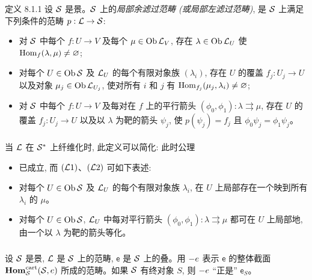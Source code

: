 \begin{enonce*}{定义 8.1.1}
设 ${\mathcal S}$ 是景。${\mathcal S}$ 上的\emph{局部余滤过范畴 (或局部左滤过范畴)}, 是 ${\mathcal S}$ 上满足下列条件的范畴 $p:\Ll\to\Ss$:
\begin{itemize}
\item[($\Ll0$)] 对 ${\mathcal S}$ 中每个 $f:U\to V$ 及每个 $\mu\in\operatorname{Ob}{\mathcal L}_V$, 存在 $\lambda\in\operatorname{Ob}{\mathcal L}_U$ 使 $\operatorname{Hom}_f(\lambda,\mu)\neq\varnothing$;

\item[($\Ll1$)] 对每个 $U\in\operatorname{Ob}{\mathcal S}$ 及 ${\mathcal L}_U$ 的每个有限对象族 $(\lambda_i)$, 存在 $U$ 的覆盖 $f_j:U_j\to U$ 以及对象 $\mu_j\in\operatorname{Ob}{\mathcal L}_{U_j}$, 使对所有 $i$ 和 $j$ 有 $\operatorname{Hom}_{f_j}(\mu_j,\lambda_i)\neq\varnothing$;

\item[($\Ll2$)] 对 ${\mathcal S}$ 中每个 $f:U\to V$ 及每对在 $f$ 上的平行箭头 $(\phi_0,\phi_1):\lambda\rightrightarrows\mu$, 存在 $U$ 的覆盖 $f_j:U_j\to U$ 以及以 $\lambda$ 为靶的箭头 $\psi_j$, 使 $p(\psi_j)=f_j$ 且 $\phi_0\psi_j=\phi_1\psi_j$。
\end{itemize}
\end{enonce*}

\setcounter{subsubsection}{1}
\paragraph{}
当 ${\mathcal L}$ 在 ${\mathcal S}^{\ast}$ 上纤维化时, 此定义可以简化: 此时公理
\begin{itemize}
\item[$(\Ll_\ast0)$] 已成立, 而 $({\mathcal L}1)$、$({\mathcal L}2)$ 可如下表述:

\item[$(\Ll'1)$] 对每个 $U\in\operatorname{Ob}{\mathcal S}$ 及 ${\mathcal L}_U$ 的每个有限对象族 $\lambda_i$, 在 $U$ 上局部存在一个映到所有 $\lambda_i$ 的 $\mu$。

\item[$(\Ll'2)$] 对每个 $U\in\operatorname{Ob}{\mathcal S}$, ${\mathcal L}_U$ 中每对平行箭头 $(\phi_0,\phi_1):\lambda\rightrightarrows\mu$ 都可在 $U$ 上局部地, 由一个以 $\lambda$ 为靶的箭头等化。
\end{itemize}

\subsubsection{}
设 ${\mathcal S}$ 是景, ${\mathcal L}$ 是 ${\mathcal S}$ 上的范畴, $\mathsf{e}$ 是 ${\mathcal S}$ 上的叠。用 $\protect\mathcal{\Gamma}{e}$ 表示 $\mathsf{e}$ 的整体截面 $\operatorname{\mathbf{Hom}}^{\operatorname{cart}}_{{\mathcal S}}({\mathcal S},{e})$ 所成的范畴。如果 ${\mathcal S}$ 有终对象 $S$, 则 $\protect\mathcal{\Gamma}{e}$ “正是” $\mathsf{e}_S$。


